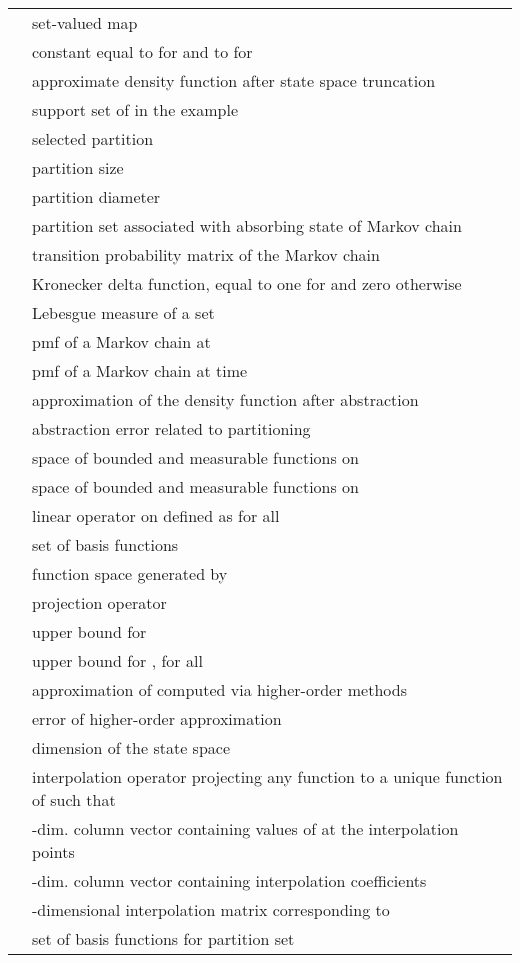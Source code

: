 \documentclass{LMCS}
\begin{document}
\begin{longtable}{lp{10.5cm}}
 & set-valued map \\
 & constant equal to  for  and to  for \\
 & approximate density function after state space truncation\\
 & support set of  in the example\\
 & selected partition\\
 & partition size\\
 & partition diameter\\
 & partition set associated with absorbing state of Markov chain\\
 & transition probability matrix of the Markov chain\\
 & Kronecker delta function, equal to one for  and zero otherwise\\
 & Lebesgue measure of a set\\
 & pmf of a Markov chain at \\
 & pmf of a Markov chain at time \\
 & approximation of the density function  after abstraction\\
 & abstraction error related to partitioning\\
 &  space of bounded and measurable functions on \\
 & space of bounded and measurable functions on \\
 & linear operator on  defined as   for all \\
 & set of basis functions \\
 & function space generated by \\
 & projection operator\\
&  upper bound for \\
&  upper bound for , for all \\
 & approximation of  computed via higher-order methods\\
 & error of higher-order approximation\\
 & dimension of the state space\\
 & interpolation operator 
projecting any function 
to a unique function of  such that \\
 & -dim. column vector containing values of  at the interpolation points\\
 & -dim. column vector containing interpolation coefficients\\
 & -dimensional interpolation matrix corresponding to \\
 & set of basis functions for partition set \\

\end{longtable}
\end{document}
